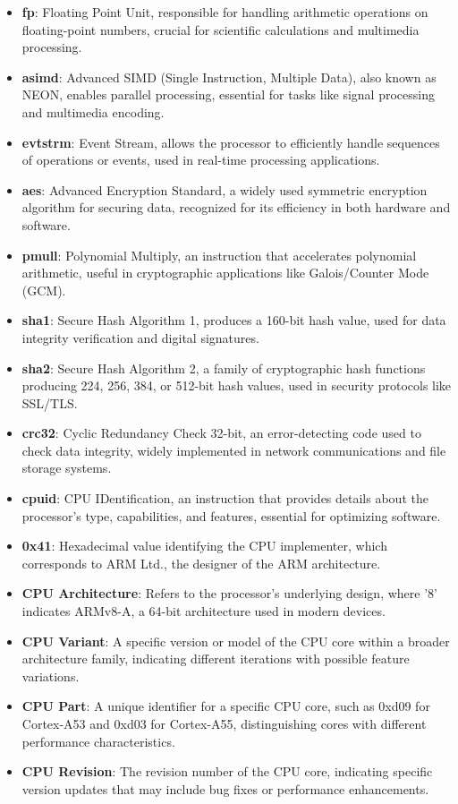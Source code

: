 \begin{itemize}
  \item \textbf{fp}: Floating Point Unit, responsible for handling arithmetic operations on floating-point numbers, crucial for scientific calculations and multimedia processing.
  \item \textbf{asimd}: Advanced SIMD (Single Instruction, Multiple Data), also known as NEON, enables parallel processing, essential for tasks like signal processing and multimedia encoding.
  \item \textbf{evtstrm}: Event Stream, allows the processor to efficiently handle sequences of operations or events, used in real-time processing applications.
  \item \textbf{aes}: Advanced Encryption Standard, a widely used symmetric encryption algorithm for securing data, recognized for its efficiency in both hardware and software.
  \item \textbf{pmull}: Polynomial Multiply, an instruction that accelerates polynomial arithmetic, useful in cryptographic applications like Galois/Counter Mode (GCM).
  \item \textbf{sha1}: Secure Hash Algorithm 1, produces a 160-bit hash value, used for data integrity verification and digital signatures.
  \item \textbf{sha2}: Secure Hash Algorithm 2, a family of cryptographic hash functions producing 224, 256, 384, or 512-bit hash values, used in security protocols like SSL/TLS.
  \item \textbf{crc32}: Cyclic Redundancy Check 32-bit, an error-detecting code used to check data integrity, widely implemented in network communications and file storage systems.
  \item \textbf{cpuid}: CPU IDentification, an instruction that provides details about the processor's type, capabilities, and features, essential for optimizing software.
  \item \textbf{0x41}: Hexadecimal value identifying the CPU implementer, which corresponds to ARM Ltd., the designer of the ARM architecture.
  \item \textbf{CPU Architecture}: Refers to the processor's underlying design, where '8' indicates ARMv8-A, a 64-bit architecture used in modern devices.
  \item \textbf{CPU Variant}: A specific version or model of the CPU core within a broader architecture family, indicating different iterations with possible feature variations.
  \item \textbf{CPU Part}: A unique identifier for a specific CPU core, such as 0xd09 for Cortex-A53 and 0xd03 for Cortex-A55, distinguishing cores with different performance characteristics.
  \item \textbf{CPU Revision}: The revision number of the CPU core, indicating specific version updates that may include bug fixes or performance enhancements.
\end{itemize}

